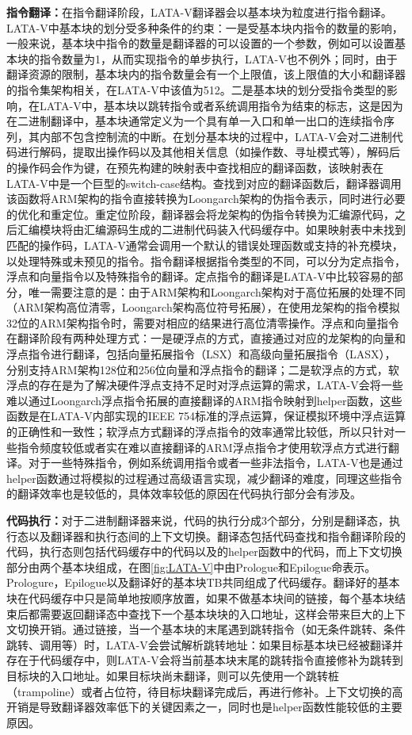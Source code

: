 \textbf{指令翻译：}在指令翻译阶段，LATA-V翻译器会以基本块为粒度进行指令翻译。LATA-V中基本块的划分受多种条件的约束：一是受基本块内指令的数量的影响，一般来说，基本块中指令的数量是翻译器的可以设置的一个参数，例如可以设置基本块的指令数量为1，从而实现指令的单步执行，LATA-V也不例外；同时，由于翻译资源的限制，基本块内的指令数量会有一个上限值，该上限值的大小和翻译器的指令集架构相关，在LATA-V中该值为512。二是基本块的划分受指令类型的影响，在LATA-V中，基本块以跳转指令或者系统调用指令为结束的标志，这是因为在二进制翻译中，基本块通常定义为一个具有单一入口和单一出口的连续指令序列，其内部不包含控制流的中断。在划分基本块的过程中，LATA-V会对二进制代码进行解码，提取出操作码以及其他相关信息（如操作数、寻址模式等），解码后的操作码会作为键，在预先构建的映射表中查找相应的翻译函数，该映射表在LATA-V中是一个巨型的switch-case结构。查找到对应的翻译函数后，翻译器调用该函数将ARM架构的指令直接转换为Loongarch架构的伪指令表示，同时进行必要的优化和重定位。重定位阶段，翻译器会将龙架构的伪指令转换为汇编源代码，之后汇编模块将由汇编源码生成的二进制代码装入代码缓存中。如果映射表中未找到匹配的操作码，LATA-V通常会调用一个默认的错误处理函数或支持的补充模块，以处理特殊或未预见的指令。指令翻译根据指令类型的不同，可以分为定点指令，浮点和向量指令以及特殊指令的翻译。定点指令的翻译是LATA-V中比较容易的部分，唯一需要注意的是：由于ARM架构和Loongarch架构对于高位拓展的处理不同（ARM架构高位清零，Loongarch架构高位符号拓展），在使用龙架构的指令模拟32位的ARM架构指令时，需要对相应的结果进行高位清零操作。浮点和向量指令在翻译阶段有两种处理方式：一是硬浮点的方式，直接通过对应的龙架构的向量和浮点指令进行翻译，包括向量拓展指令（LSX）和高级向量拓展指令（LASX），分别支持ARM架构128位和256位向量和浮点指令的翻译；二是软浮点的方式，软浮点的存在是为了解决硬件浮点支持不足时对浮点运算的需求，LATA-V会将一些难以通过Loongarch浮点指令拓展的直接翻译的ARM指令映射到helper函数，这些函数是在LATA-V内部实现的IEEE 754标准的浮点运算，保证模拟环境中浮点运算的正确性和一致性；软浮点方式翻译的浮点指令的效率通常比较低，所以只针对一些指令频度较低或者实在难以直接翻译的ARM浮点指令才使用软浮点方式进行翻译。对于一些特殊指令，例如系统调用指令或者一些非法指令，LATA-V也是通过helper函数通过将模拟的过程通过高级语言实现，减少翻译的难度，同理这些指令的翻译效率也是较低的，具体效率较低的原因在代码执行部分会有涉及。

\textbf{代码执行：}对于二进制翻译器来说，代码的执行分成3个部分，分别是翻译态，执行态以及翻译器和执行态间的上下文切换。翻译态包括代码查找和指令翻译阶段的代码，执行态则包括代码缓存中的代码以及的helper函数中的代码，而上下文切换部分由两个基本块组成，在图\ref{fig:LATA-V}中由Prologue和Epilogue命表示。Prologure，Epilogue以及翻译好的基本块TB共同组成了代码缓存。翻译好的基本块在代码缓存中只是简单地按顺序放置，如果不做基本块间的链接，每个基本块结束后都需要返回翻译态中查找下一个基本块块的入口地址，这样会带来巨大的上下文切换开销。通过链接，当一个基本块的末尾遇到跳转指令（如无条件跳转、条件跳转、调用等）时，LATA-V会尝试解析跳转地址：如果目标基本块已经被翻译并存在于代码缓存中，则LATA-V会将当前基本块末尾的跳转指令直接修补为跳转到目标块的入口地址。如果目标块尚未翻译，则可以先使用一个跳转桩（trampoline）或者占位符，待目标块翻译完成后，再进行修补。上下文切换的高开销是导致翻译器效率低下的关键因素之一，同时也是helper函数性能较低的主要原因。


